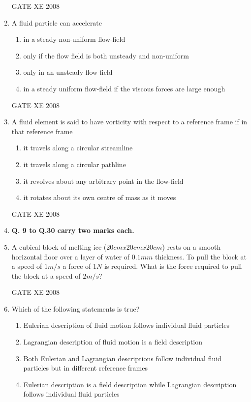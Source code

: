 \documentclass[12pt]{article}
\begin{document}
\begin{enumerate}[label=Q\arabic*.]
GATE XE 2008
\item A fluid particle can accelerate

\begin{enumerate}[label=(\Alph*)]
\item  in a steady non-uniform flow-field
\item  only if the flow field is both unsteady and non-uniform 
\item  only in an unsteady flow-field
\item  in a steady uniform flow-field if the viscous forces are large enough
\end{enumerate}

GATE XE 2008
\item A fluid element is said to have vorticity with respect to a reference frame if in that reference frame

\begin{enumerate}[label=(\Alph*)]
\item  it travels along a circular streamline
\item  it travels along a circular pathline
\item  it revolves about any arbitrary point in the flow-field
\item  it rotates about its own centre of mass as it moves
\end{enumerate}

GATE XE 2008
\item[] \textbf{Q. 9 to Q.30 carry two marks each.}

\item A cubical block of melting ice ($20 cm x 20 cm x 20 cm$) rests on a smooth horizontal floor over a layer of water of $0.1 mm$ thickness. To pull the block at a speed of $1 m/s$ a force of $1 N$ is required. What is the force required to pull the block at a speed of $2 m/s$?

\begin{enumerate}[label=(\Alph*)]
\end{enumerate}

GATE XE 2008
\item  Which of the following statements is true?

\begin{enumerate}[label=(\Alph*)]
\item  Eulerian description of fluid motion follows individual fluid particles 
\item  Lagrangian description of fluid motion is a field description 
\item  Both Eulerian and Lagrangian descriptions follow individual fluid particles but in different reference frames
\item  Eulerian description is a field description while Lagrangian description follows individual fluid particles
\end{enumerate}


\end{enumerate}
\end{document}

